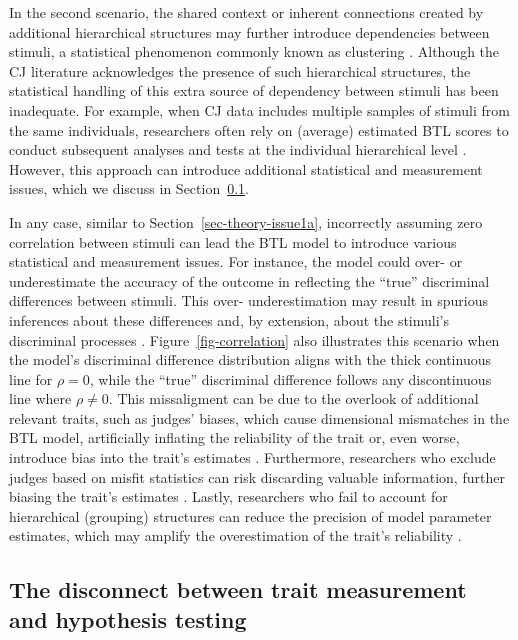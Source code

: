 \documentclass[
  authoryear,
  preprint,
  1p]{elsarticle}
\begin{document}
In the second scenario, the shared context or inherent connections
created by additional hierarchical structures may further introduce
dependencies between stimuli, a statistical phenomenon commonly known as
clustering \citep{Everitt_et_al_2010}. Although the CJ literature
acknowledges the presence of such hierarchical structures, the
statistical handling of this extra source of dependency between stimuli
has been inadequate. For example, when CJ data includes multiple samples
of stimuli from the same individuals, researchers often rely on
(average) estimated BTL scores to conduct subsequent analyses and tests
at the individual hierarchical level
\citep{Bramley_et_al_2019, Boonen_et_al_2020, Bouwer_et_al_2023, vanDaal_et_al_2017, Jones_et_al_2019, Gijsen_et_al_2021}.
However, this approach can introduce additional statistical and
measurement issues, which we discuss in Section~\ref{sec-theory-issue2}.

{In any case, similar to Section~\ref{sec-theory-issue1a}, incorrectly
assuming zero correlation between stimuli can lead the BTL model to
introduce various statistical and measurement issues. For instance, the
model could over- or underestimate the accuracy of the outcome in
reflecting the ``true'' discriminal differences between stimuli. This
over- underestimation may result in spurious inferences about these
differences and, by extension, about the stimuli's discriminal processes
\citep[pp.~341]{Hoyle_et_al_2023}. Figure~\ref{fig-correlation} also
illustrates this scenario when the model's discriminal difference
distribution aligns with the thick continuous line for \(\rho=0\), while
the ``true'' discriminal difference follows any discontinuous line where
\(\rho \neq 0\). This missaligment can be due to the overlook of
additional relevant traits, such as judges' biases, which cause
dimensional mismatches in the BTL model, artificially inflating the
reliability of the trait \citep[pp.~341]{Hoyle_et_al_2023} or, even
worse, introduce bias into the trait's estimates \citep{Ackerman_1989}.
Furthermore, researchers who exclude judges based on misfit statistics
can risk discarding valuable information, further biasing the trait's
estimates \citep[chap.~12]{Zimmerman_1994, McElreath_2020}. Lastly,
researchers who fail to account for hierarchical (grouping) structures
can reduce the precision of model parameter estimates, which may amplify
the overestimation of the trait's reliability
\citep[pp.~482]{Hoyle_et_al_2023}.}

\subsection{The disconnect between trait measurement and hypothesis
testing}\label{sec-theory-issue2}
\end{document}
